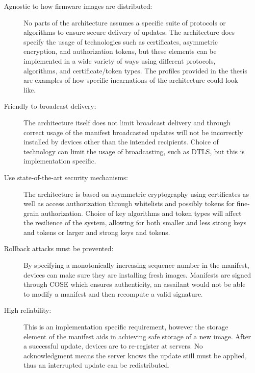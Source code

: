 \documentclass[0-thesis.tex]{subfiles}
\begin{document}
\begin{description}
    \item[Agnostic to how firmware images are distributed:]
        No parts of the architecture assumes a specific suite of protocols or algorithms
        to ensure secure delivery of updates. The architecture does specify the usage of
        technologies such as certificates, asymmetric encryption, and authorization
        tokens, but these elements can be implemented in a wide variety of ways using
        different protocols, algorithms, and certificate/token types. The profiles
        provided in the thesis are examples of how specific incarnations of the
        architecture could look like.

    \item[Friendly to broadcast delivery:]
        The architecture itself does not limit broadcast delivery and through correct
        usage of the manifest broadcasted updates will not be incorrectly installed by
        devices other than the intended recipients. Choice of technology can limit the
        usage of broadcasting, such as DTLS, but this is implementation specific.

    \item[Use state-of-the-art security mechanisms:]
        The architecture is based on asymmetric cryptography using certificates as well as
        access authorization through whitelists and possibly tokens for fine-grain
        authorization. Choice of key algorithms and token types will affect the resilience
        of the system, allowing for both smaller and less strong keys and tokens or larger
        and strong keys and tokens. %

    \item[Rollback attacks must be prevented:]
        By specifying a monotonically increasing sequence number in the manifest, devices
        can make sure they are installing fresh images. Manifests are signed through COSE
        which ensures authenticity, an assailant would not be able to modify a manifest
        and then recompute a valid signature.

    \item[High reliability:]
        This is an implementation specific requirement, however the storage element of the
        manifest aids in achieving safe storage of a new image. After a successful update,
        devices are to re-register at servers. No acknowledgment means the server knows
        the update still must be applied, thus an interrupted update can be redistributed.


\end{description}
\end{document}
